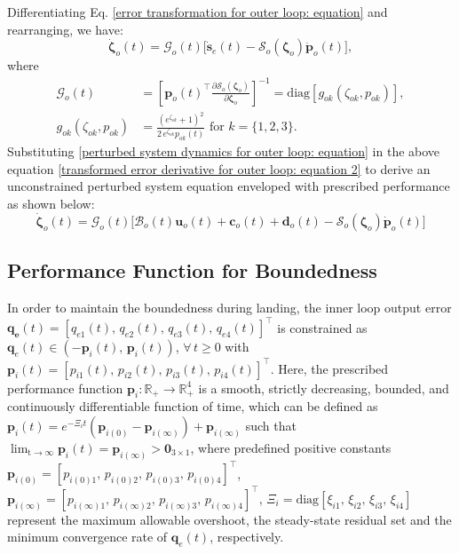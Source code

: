 \documentclass[lettersize,journal]{IEEEtran}
\begin{document}
Differentiating Eq. \eqref{error transformation for outer loop: equation} and rearranging, we have:
\begin{equation} \label{transformed error derivative for outer loop: equation 2}
    \dot{\boldsymbol{\zeta}}_o(t) = \mathcal{G}_o(t) \big[\dot{\boldsymbol{s}}_{e}(t) - \mathcal{S}_o(\boldsymbol{\zeta}_o) \dot{\boldsymbol{p}}_o(t)\big],    
\end{equation}
where
\begin{align*}
    \mathcal{G}_o(t) &= \left[\boldsymbol{p}_o(t)^{\top} \frac{\partial \mathcal{S}_o(\boldsymbol{\zeta}_o)}{\partial \boldsymbol{\zeta}_o}\right]^{-1} = \text{diag}[g_{ok}(\zeta_{ok}, p_{ok})], \nonumber \\
    g_{ok}(\zeta_{ok}, p_{ok}) &= \frac{(e^{\zeta_{ok}}+1)^2}{2\,e^{\zeta_{ok}} p_{ok}(t)} \text{ for } k = \{1, 2, 3\}. \nonumber
\end{align*}
Substituting  \eqref{perturbed system dynamics for outer loop: equation} in the above equation \eqref{transformed error derivative for outer loop: equation 2} to derive an unconstrained perturbed system equation enveloped with prescribed performance as shown below:
\begin{equation} \label{unconstrained system for outer loop: equation}
    \dot{\boldsymbol{\zeta}}_o(t) = \mathcal{G}_o(t) \big[\mathcal{B}_o(t) \boldsymbol{u}_o(t) + \boldsymbol{c}_o(t) + \boldsymbol{d}_o(t) - \mathcal{S}_o(\boldsymbol{\zeta}_o) \dot{\boldsymbol{p}}_o(t) \big]
\end{equation}

\subsection{Performance Function for Boundedness}
In order to maintain the boundedness during landing, the inner loop output error $\boldsymbol{q_e}(t) = [q_{e 1}(t), \, q_{e 2}(t), \, q_{e 3}(t), \, q_{e 4}(t)]^{\top}$ is constrained as $\boldsymbol{q}_{e}(t) \in (- \boldsymbol{p}_i(t), \, \boldsymbol{p}_i(t))$, $\forall \, t \geq 0$ with $\boldsymbol{p}_i(t) = [p_{i 1}(t), \, p_{i 2}(t), \, p_{i 3}(t), \, p_{i 4}(t)]^{\top}$.
Here, the prescribed performance function $\boldsymbol{p}_i: \mathbb{R}_+ \rightarrow \mathbb{R}^4_+$ is a smooth, strictly decreasing, bounded, and continuously differentiable function of time, which can be defined as $\boldsymbol{p}_i(t) = e^{-\Xi_i t} (\boldsymbol{p}_{i (0)} - \boldsymbol{p}_{i (\infty)}) + \boldsymbol{p}_{i (\infty)}$ such that
$\lim_{\text{t} \to \infty} \boldsymbol{p}_i(t) = \boldsymbol{p}_{i (\infty)} > \boldsymbol{0}_{3 \times 1}$, where predefined positive constants $\boldsymbol{p}_{i (0)} = [p_{i(0) 1}, \, p_{i(0) 2}, \, p_{i(0) 3}, \, p_{i(0) 4}]^{\top}$, $\boldsymbol{p}_{i (\infty)} = [p_{i(\infty) 1}, \, p_{i(\infty) 2}, \, p_{i(\infty) 3}, \, p_{i(\infty) 4}]^{\top}$, $\Xi_i = \text{diag}[\xi_{i 1}, \, \xi_{i 2}, \, \xi_{i 3}, \, \xi_{i 4}]$ represent the maximum allowable overshoot, the steady-state residual set and the minimum convergence rate of $\boldsymbol{q}_{e}(t)$, respectively.
\end{document}
